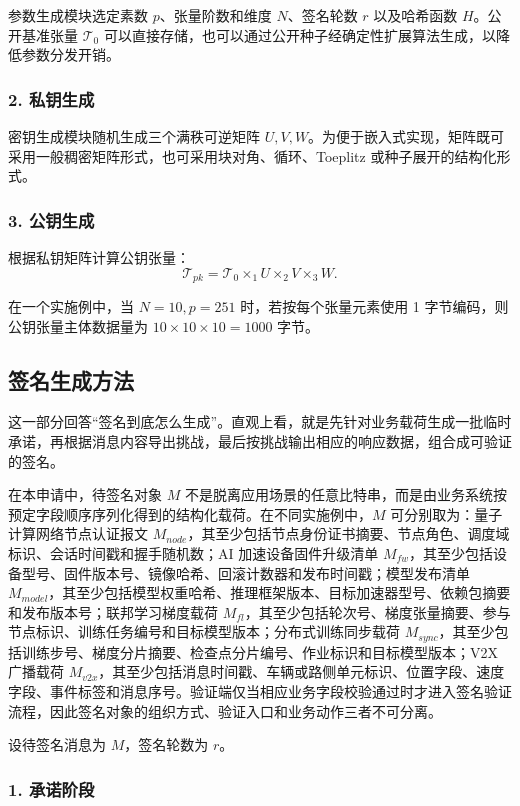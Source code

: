 \documentclass[12pt,a4paper]{article}
\begin{document}
参数生成模块选定素数 $p$、张量阶数和维度 $N$、签名轮数 $r$ 以及哈希函数 $H$。公开基准张量 $\mathcal{T}_0$ 可以直接存储，也可以通过公开种子经确定性扩展算法生成，以降低参数分发开销。

\subsubsection{2. 私钥生成}

密钥生成模块随机生成三个满秩可逆矩阵 $U,V,W$。为便于嵌入式实现，矩阵既可采用一般稠密矩阵形式，也可采用块对角、循环、Toeplitz 或种子展开的结构化形式。

\subsubsection{3. 公钥生成}

根据私钥矩阵计算公钥张量：
\[
\mathcal{T}_{pk}=\mathcal{T}_0 \times_1 U \times_2 V \times_3 W.
\]

在一个实施例中，当 $N=10,p=251$ 时，若按每个张量元素使用 1 字节编码，则公钥张量主体数据量为 $10 \times 10 \times 10=1000$ 字节。

\subsection{签名生成方法}

这一部分回答“签名到底怎么生成”。直观上看，就是先针对业务载荷生成一批临时承诺，再根据消息内容导出挑战，最后按挑战输出相应的响应数据，组合成可验证的签名。

在本申请中，待签名对象 $M$ 不是脱离应用场景的任意比特串，而是由业务系统按预定字段顺序序列化得到的结构化载荷。在不同实施例中，$M$ 可分别取为：量子计算网络节点认证报文 $M_{node}$，其至少包括节点身份证书摘要、节点角色、调度域标识、会话时间戳和握手随机数；AI 加速设备固件升级清单 $M_{fw}$，其至少包括设备型号、固件版本号、镜像哈希、回滚计数器和发布时间戳；模型发布清单 $M_{model}$，其至少包括模型权重哈希、推理框架版本、目标加速器型号、依赖包摘要和发布版本号；联邦学习梯度载荷 $M_{fl}$，其至少包括轮次号、梯度张量摘要、参与节点标识、训练任务编号和目标模型版本；分布式训练同步载荷 $M_{sync}$，其至少包括训练步号、梯度分片摘要、检查点分片编号、作业标识和目标模型版本；V2X 广播载荷 $M_{v2x}$，其至少包括消息时间戳、车辆或路侧单元标识、位置字段、速度字段、事件标签和消息序号。验证端仅当相应业务字段校验通过时才进入签名验证流程，因此签名对象的组织方式、验证入口和业务动作三者不可分离。

设待签名消息为 $M$，签名轮数为 $r$。

\subsubsection{1. 承诺阶段}
\end{document}
